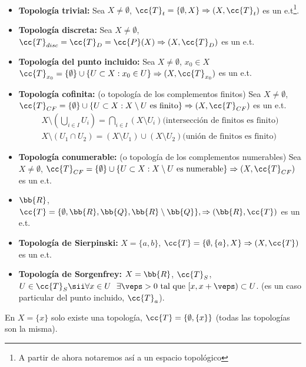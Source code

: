 \begin{ejemplo}\ 
    \begin{itemize}
        \item \textbf{Topología trivial:} Sea $X \neq \emptyset$, $\cc{T}_t = \{\emptyset, X\} \Rightarrow (X, \cc{T}_t)$ es un e.t\footnote{A partir de ahora notaremos así a un espacio topológico}.
        \item \textbf{Topología discreta:} Sea $X \neq \emptyset$, $\cc{T}_{disc}= \cc{T}_{D} = \cc{P}(X) \Rightarrow (X, \cc{T}_D)$ es un e.t.
        \item \textbf{Topología del punto incluido:} Sea $X \neq \emptyset$, $x_0\in X$ $\cc{T}_{x_0} = \{\emptyset\}\cup \{U \subset X : x_0 \in U\} \Rightarrow (X, \cc{T}_{x_0})$ es un e.t.
        \item \textbf{Topología cofinita:} (o topología de los complementos finitos) Sea $X \neq \emptyset$, $\cc{T}_{CF} = \{\emptyset\}\cup\{U\subset X : X \setminus U \text{ es finito}\} \Rightarrow (X, \cc{T}_{CF})$ es un e.t.
        \begin{gather*}
            X \setminus \left(\bigcup\limits_{i\in I}U_i\right) = \bigcap\limits_{i\in I}(X \setminus U_i) \text{(intersección de finitos es finito)}\\
            X \setminus (U_1 \cap U_2) = (X\setminus U_1) \cup (X \setminus U_2)\text{(unión de finitos es finito)}
        \end{gather*}
        \item \textbf{Topología conumerable:} (o topología de los complementos numerables) Sea $X \neq \emptyset$, $\cc{T}_{CF} = \{\emptyset\}\cup\{U\subset X : X \setminus U \text{ es numerable}\} \Rightarrow (X, \cc{T}_{CF})$ es un e.t.
        \item $\bb{R}$, $ \cc{T}=\{\emptyset, \bb{R}, \bb{Q}, \bb{R}\setminus \bb{Q}\}, \Rightarrow (\bb{R}, \cc{T})$ es un e.t. 
        \item \textbf{Topología de Sierpinski:} $X=\{a,b\}$, $\cc{T}=\{\emptyset, \{a\}, X\} \Rightarrow (X, \cc{T})$ es un e.t.
        \item \textbf{Topología de Sorgenfrey:} $X=\bb{R}$, $\cc{T}_S$, $U\in \cc{T}_S \sii \forall x \in U \ \  \exists \veps > 0 \text{ tal que } [x, x+\veps) \subset U$. (es un caso particular del punto incluido, $\cc{T}_a$).
    \end{itemize}

    \newpage

    \begin{observacion}
        En $X=\{x\}$ solo existe una topología, $\cc{T}=\{\emptyset, \{x\}\}$ (todas las topologías son la misma).
    \end{observacion}


\end{ejemplo}

